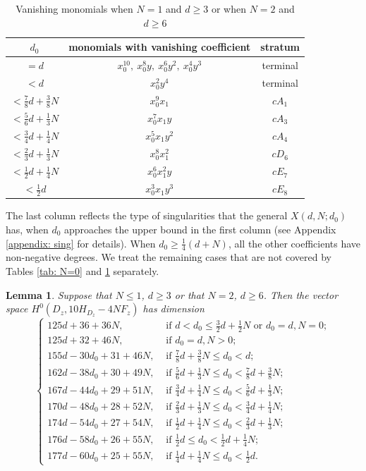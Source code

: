 \documentclass[a4paper,11pt]{amsart}
\newtheorem{lem}[thm]{Lemma}
\theoremstyle{definition}
\theoremstyle{remark}
\numberwithin{equation}{section}
\begin{document}
\begin{table}[ht] \caption{Vanishing monomials when $N = 1$ and $d \ge 3$ or when $N = 2$ and $d \ge 6$} \label{tab: N=1}
	\begin{tabular}{ccc}
        \hline
		$d_0$ & monomials with vanishing coefficient & stratum\\
		\hline
		$= d$ & $x_0^{10},\ x_0^8y,\ x_0^6y^2,\ x_0^4y^3$ & terminal \\
		$< d$ & $x_0^2y^4$ & terminal  \\
		$<\frac78d + \frac38N$ & $x_0^9x_1$ &$cA_1$\\
		$<\frac56d + \frac13N$ & $x_0^7x_1y$ &$cA_3$\\
		$<\frac34d + \frac14N$ & $x_0^5x_1y^2$ &$cA_4$ \\
		$<\frac23d + \frac13N$ & $x_0^8x_1^2$ &$cD_6$\\
		$<\frac12d + \frac14N$ & $x_0^6x_1^2y$ & $cE_7$ \\
		$<\frac12d$ & $x_0^3x_1y^3$ & $cE_8$ \\
	\end{tabular}
\end{table}

The last column reflects the type of singularities that the general $X(d, N; d_0)$ has, when $d_0$ approaches the upper bound in the first column (see Appendix \ref{appendix: sing} for details). When $d_0 \ge \frac14(d + N)$, all the other coefficients have non-negative degrees. We treat the remaining cases that are not covered by Tables \ref{tab: N=0} and \ref{tab: N=1} separately.

\begin{lem} \label{lem: dimension 10H}
	Suppose that $N \le 1$, $d \ge 3$ or that $N = 2$, $d \ge 6$. Then the vector space $H^0(D_z, 10H_{D_z} - 4NF_z)$ has dimension
    $$
    \begin{cases}
        125d + 36 + 36N, & \text{ if } d < d_0 \le \frac32d + \frac12N \text{ or } d_0=d, N=0;\\ 
		125d + 32 + 46N, & \text{ if } d_0 = d, N>0; \\
		155d - 30d_0 + 31 + 46N, & \text{ if } \frac78d + \frac38 N \le d_0 < d;\\ 
		162d - 38d_0 + 30 + 49N, & \text{ if } \frac56d + \frac13 N \le d_0 < \frac78d + \frac38 N;\\ 
		167d - 44d_0 + 29 + 51N, & \text{ if } \frac34d + \frac14 N \le d_0 < \frac56d + \frac13 N;\\ 
		170d - 48d_0 + 28 + 52N, & \text{ if } \frac23d + \frac13 N \le d_0 < \frac34d + \frac14 N;\\ 
		174d - 54d_0 + 27 + 54N, & \text{ if } \frac12d + \frac14 N \le d_0 < \frac23d + \frac13 N;\\
		176d - 58d_0 + 26 + 55N, & \text{ if } \frac12d \le d_0 < \frac12d + \frac14 N;\\
		177d - 60d_0 + 25 + 55N, & \text{ if } \frac14d + \frac14 N \le d_0 < \frac12d. 	 
    \end{cases}
    $$
\end{lem}
    
\end{document}
